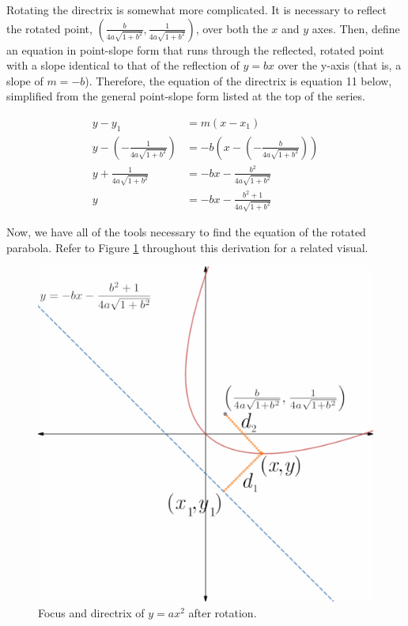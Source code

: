 \documentclass{article}
\begin{document}
Rotating the directrix is somewhat more complicated. It is necessary to reflect the rotated point, $\left(\frac{b}{4a\sqrt{1+b^2}},\frac{1}{4a\sqrt{1+b^2}}\right)$, over both the $x$ and $y$ axes. Then, define an equation in point-slope form that runs through the reflected, rotated point with a slope identical to that of the reflection of $y=bx$ over the y-axis (that is, a slope of $m=-b$). Therefore, the equation of the directrix is equation 11 below, simplified from the general point-slope form listed at the top of the series.

\begin{align*}
y-y_1 &= m\left(x-x_1\right)\\
y-\left(-\frac{1}{4a\sqrt{1+b^2}}\right) &= -b\left(x-\left(-\frac{b}{4a\sqrt{1+b^2}}\right)\right)\\
y+\frac{1}{4a\sqrt{1+b^2}} &= -bx-\frac{b^2}{4a\sqrt{1+b^2}}\\
y &= -bx-\frac{b^2+1}{4a\sqrt{1+b^2}}\tag{11}
\end{align*}

Now, we have all of the tools necessary to find the equation of the rotated parabola. Refer to Figure \ref{fig:disk4} throughout this derivation for a related visual.

\begin{figure}[h!]
  \centering
  \includegraphics[width=0.6\linewidth]{Blender/ParabolaLineIntegration-DiskFD2-f2_0001.png}
  \caption{Focus and directrix of $y=ax^2$ after rotation.}
  \label{fig:disk4}
\end{figure}
\end{document}
